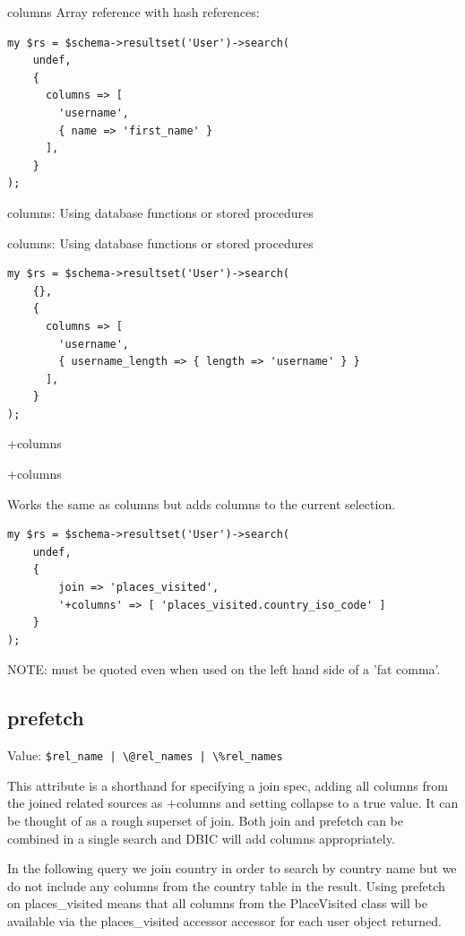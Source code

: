 \begin{frame}[fragile]{columns}
Array reference with hash references:

\begin{lstlisting}
my $rs = $schema->resultset('User')->search(
    undef,
    {
      columns => [
        'username',
        { name => 'first_name' }
      ],
    }
);
\end{lstlisting}
\end{frame}

columns: Using database functions or stored procedures

\begin{frame}[fragile]{columns: Using database functions or stored
    procedures}
\begin{lstlisting}
my $rs = $schema->resultset('User')->search(
    {},
    {
      columns => [
        'username',
        { username_length => { length => 'username' } }
      ],
    }
);
\end{lstlisting}
\end{frame}

+columns

\begin{frame}[fragile]{+columns}

Works the same as columns but adds columns to the current selection.

\begin{lstlisting}
my $rs = $schema->resultset('User')->search(
    undef,
    {
        join => 'places_visited',
        '+columns' => [ 'places_visited.country_iso_code' ]
    }
);
\end{lstlisting}
\end{frame}

NOTE: must be quoted even when used on the left hand side of a 'fat comma'.

\subsection{prefetch}

Value: \verb=$rel_name | \@rel_names | \%rel_names=

This attribute is a shorthand for specifying a join spec, adding all columns
from the joined related sources as +columns and setting collapse to a true
value. It can be thought of as a rough superset of join. Both join and
prefetch can be combined in a single search and DBIC will add columns
appropriately.

In the following query we join country in order to search by country name
but we do not include any columns from the country table in the
result. Using prefetch on places\_visited means that all columns from the PlaceVisited
class will be available via the places\_visited accessor accessor for each user
object returned.

